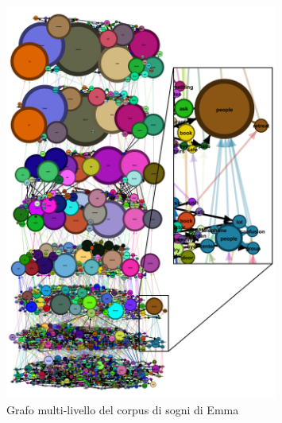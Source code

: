 \begin{figure}[h]
    \centering
    \includegraphics[width=0.8\textwidth]{Immagini/mlg_emma_focus_example.png}
    \caption{Grafo multi-livello del corpus di sogni di Emma}
    \label{fig:mlg-emma-example}
\end{figure}